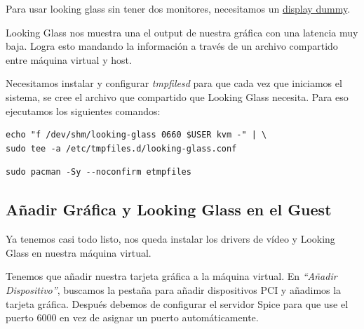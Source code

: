 \documentclass[11pt]{article}
\begin{document}
Para usar looking glass sin tener dos monitores, necesitamos un \href{https://www.amazon.com/s?k=display+dummy}{display dummy}.

\medskip
Looking Glass nos muestra una el output de nuestra gráfica con una latencia muy baja. Logra esto mandando la información a través de un archivo compartido entre máquina virtual y host.

Necesitamos instalar y configurar \emph{tmpfilesd} para que cada vez que iniciamos el sistema, se cree el archivo que compartido que Looking Glass necesita. Para eso ejecutamos los siguientes comandos:

\begin{verbatim}
echo "f /dev/shm/looking-glass 0660 $USER kvm -" | \
sudo tee -a /etc/tmpfiles.d/looking-glass.conf
\end{verbatim}
\begin{verbatim}
sudo pacman -Sy --noconfirm etmpfiles
\end{verbatim}

\subsection{Añadir Gráfica y Looking Glass en el Guest}

Ya tenemos casi todo listo, nos queda instalar los drivers de vídeo y Looking Glass en nuestra máquina virtual.

\medskip
Tenemos que añadir nuestra tarjeta gráfica a la máquina virtual. En \emph{``Añadir Dispositivo''}, buscamos la pestaña para añadir dispositivos PCI y añadimos la tarjeta gráfica.
Después debemos de configurar el servidor Spice para que use el puerto 6000 en vez de asignar un puerto automáticamente.
\end{document}
